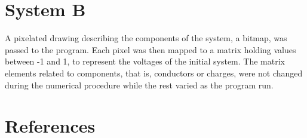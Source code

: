 \documentclass[a4paper]{jpconf}
\begin{document}
\section*{System B}

A pixelated drawing describing the components of the system, a bitmap, was passed to the program. Each pixel was then mapped to a matrix holding values between -1 and 1, to represent the voltages of the initial system. The matrix elements related to components, that is, conductors or charges, were not changed during the numerical procedure while the rest varied as the program run.


\section*{References}


\end{document}
